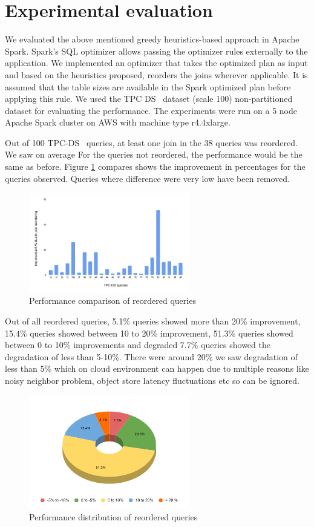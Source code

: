 \section{Experimental evaluation}\label{sec:exp-evaluation}
We evaluated the above mentioned greedy heuristics-based approach in Apache Spark. Spark's SQL optimizer allows passing the optimizer rules externally to the application. We implemented an optimizer that takes the optimized plan as input and based on the heuristics proposed, reorders the joins wherever applicable. It is assumed that the table sizes are available in the Spark optimized plan before applying this rule. We used the TPC DS~\cite{b14}  dataset (scale 100) non-partitioned dataset for evaluating the performance. The experiments were run on a 5 node Apache Spark cluster on AWS with machine type r4.4xlarge.

Out of 100 TPC-DS~\cite{b14}  queries, at least one join in the 38 queries was reordered. We saw on average  For the queries not reordered, the performance would be the same as before. Figure \ref{performance_number} compares shows the improvement in percentages for the queries observed. Queries where difference were very low have been removed.

\begin{figure}[ht]
    \centerline{\includegraphics[width=7cm]{fig/chart.png}}
    \caption{Performance comparison of reordered queries}
    \label{performance_number}
\end{figure}

Out of all reordered queries, 5.1\% queries showed more than 20\% improvement, 15.4\% queries showed between 10 to 20\% improvement, 51.3\% queries showed between 0 to 10\% improvements and degraded 7.7\% queries showed the degradation of less than 5-10\%.
There were around 20\% we saw degradation of less than 5\% which on cloud environment can happen due to multiple reasons like noisy neighbor problem, object store latency fluctuations etc so can be ignored.

\begin{figure}[ht]
\centerline{\includegraphics[width=7cm]{fig/pie.png}}
\caption{Performance distribution of reordered queries}
\label{performance_pie_chart}
\end{figure}

